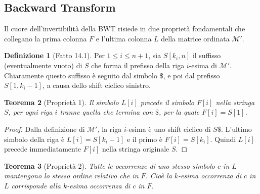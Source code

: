 \documentclass[12pt, a4paper, oneside]{book}
\theoremstyle{plain}
\newtheorem{teorema}{Teorema}[chapter]
\theoremstyle{definition}
\newtheorem{definizione}[teorema]{Definizione}
\theoremstyle{remark}
\begin{document}
\subsection{Backward Transform}
\label{subsec:bwt-backward}

Il cuore dell'invertibilità della BWT risiede in due proprietà fondamentali che collegano la prima colonna $F$ e l'ultima colonna $L$ della matrice ordinata $\mathcal{M}'$.

\begin{definizione}[Fatto 14.1]
Per $1 \le i \le n+1$, sia $S[k_i, n]$ il suffisso (eventualmente vuoto) di $S$ che forma il prefisso della riga $i$-esima di $\mathcal{M}'$. Chiaramente questo suffisso è seguito dal simbolo $\$$, e poi dal prefisso $S[1, k_i - 1]$, a causa dello shift ciclico sinistro.
\end{definizione}

\begin{teorema}[Proprietà 1]
\label{thm:bwt-prop1}
Il simbolo $L[i]$ precede il simbolo $F[i]$ nella stringa $S$, per ogni riga $i$ tranne quella che termina con $\$$, per la quale $F[i] = S[1]$.
\end{teorema}

\begin{proof}
Dalla definizione di $\mathcal{M}'$, la riga $i$-esima è uno shift ciclico di $S\$$. L'ultimo simbolo della riga è $L[i] = S[k_i - 1]$ e il primo è $F[i] = S[k_i]$. Quindi $L[i]$ precede immediatamente $F[i]$ nella stringa originale $S$.
\end{proof}

\begin{teorema}[Proprietà 2]
\label{thm:bwt-prop2}
Tutte le occorrenze di uno stesso simbolo $c$ in $L$ mantengono lo stesso ordine relativo che in $F$. Cioè la $k$-esima occorrenza di $c$ in $L$ corrisponde alla $k$-esima occorrenza di $c$ in $F$.
\end{teorema}
\end{document}
